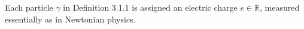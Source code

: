 Each particle $\gamma$ in Definition 3.1.1 is assigned an electric charge $e \in \mathbb{R}$, measured essentially as in Newtonian physics.
